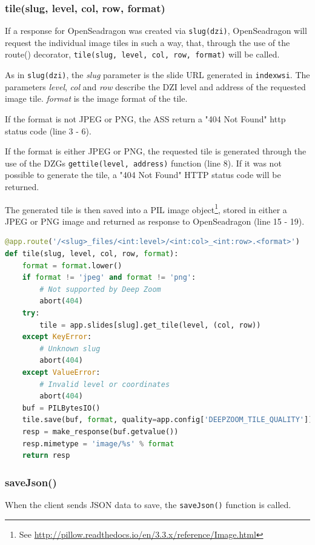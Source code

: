 \subsubsection{tile(slug, level, col, row, format)}
If a response for OpenSeadragon was created via \texttt{slug(dzi)}, OpenSeadragon will request the individual image tiles in such a way, that, through the use of the route() decorator, \texttt{tile(slug, level, col, row, format)} will be called.

As in \texttt{slug(dzi)}, the \emph{slug} parameter is the slide URL generated in \texttt{index{\textunderscore}wsi}. The parameters \emph{level}, \emph{col} and \emph{row} describe the DZI level and address of the requested image tile. \emph{format} is the image format of the tile.

If the format is not JPEG or PNG, the ASS return a "404 Not Found" http status code (line 3 - 6).

If the format is either JPEG or PNG, the requested tile is generated through the use of the DZGs \texttt{get{\textunderscore}tile(level, address)} function (line 8). If it was not possible to generate the tile, a "404 Not Found" HTTP status code will be returned.

The generated tile is then saved into a PIL image object\footnote{See \url{http://pillow.readthedocs.io/en/3.3.x/reference/Image.html}}, stored in either a JPEG or PNG image and returned as response to OpenSeadragon (line 15 - 19).

\begin{lstlisting}[language=Python, frame=single]
@app.route('/<slug>_files/<int:level>/<int:col>_<int:row>.<format>')
def tile(slug, level, col, row, format):
	format = format.lower()
	if format != 'jpeg' and format != 'png':
		# Not supported by Deep Zoom
		abort(404)
	try:
		tile = app.slides[slug].get_tile(level, (col, row))
	except KeyError:
		# Unknown slug
		abort(404)
	except ValueError:
		# Invalid level or coordinates
		abort(404)
	buf = PILBytesIO()
	tile.save(buf, format, quality=app.config['DEEPZOOM_TILE_QUALITY'])
	resp = make_response(buf.getvalue())
	resp.mimetype = 'image/%s' % format
	return resp
\end{lstlisting}


\subsubsection{saveJson()}
When the client sends JSON data to save, the \texttt{saveJson()} function is called.

